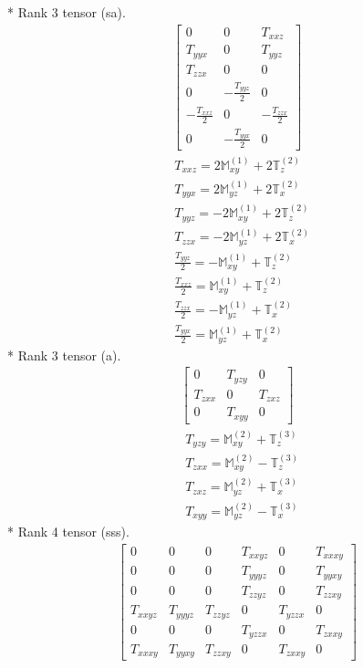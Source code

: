 \documentclass[fleqn,8pt,landscape]{jsarticle}
\begin{document}
* Rank 3 tensor (sa).
\begin{align*}
\begin{bmatrix} 0 & 0 & T_{xxz} \\ T_{yyx} & 0 & T_{yyz} \\ T_{zzx} & 0 & 0 \\ 0 & - \frac{T_{yyz}}{2} & 0 \\ - \frac{T_{xxz}}{2} & 0 & - \frac{T_{zzx}}{2} \\ 0 & - \frac{T_{yyx}}{2} & 0 \end{bmatrix}
\end{align*}
\begin{align*}
& T_{xxz} = 2 \mathbb{M}_{xy}^{(1)} + 2 \mathbb{T}_{z}^{(2)} \\
& T_{yyx} = 2 \mathbb{M}_{yz}^{(1)} + 2 \mathbb{T}_{x}^{(2)} \\
& T_{yyz} = - 2 \mathbb{M}_{xy}^{(1)} + 2 \mathbb{T}_{z}^{(2)} \\
& T_{zzx} = - 2 \mathbb{M}_{yz}^{(1)} + 2 \mathbb{T}_{x}^{(2)} \\
& \frac{T_{yyz}}{2} = - \mathbb{M}_{xy}^{(1)} + \mathbb{T}_{z}^{(2)} \\
& \frac{T_{xxz}}{2} = \mathbb{M}_{xy}^{(1)} + \mathbb{T}_{z}^{(2)} \\
& \frac{T_{zzx}}{2} = - \mathbb{M}_{yz}^{(1)} + \mathbb{T}_{x}^{(2)} \\
& \frac{T_{yyx}}{2} = \mathbb{M}_{yz}^{(1)} + \mathbb{T}_{x}^{(2)}
\end{align*}
* Rank 3 tensor (a).
\begin{align*}
\begin{bmatrix} 0 & T_{yzy} & 0 \\ T_{zxx} & 0 & T_{zxz} \\ 0 & T_{xyy} & 0 \end{bmatrix}
\end{align*}
\begin{align*}
& T_{yzy} = \mathbb{M}_{xy}^{(2)} + \mathbb{T}_{z}^{(3)} \\
& T_{zxx} = \mathbb{M}_{xy}^{(2)} - \mathbb{T}_{z}^{(3)} \\
& T_{zxz} = \mathbb{M}_{yz}^{(2)} + \mathbb{T}_{x}^{(3)} \\
& T_{xyy} = \mathbb{M}_{yz}^{(2)} - \mathbb{T}_{x}^{(3)}
\end{align*}
* Rank 4 tensor (sss).
\begin{align*}
\begin{bmatrix} 0 & 0 & 0 & T_{xxyz} & 0 & T_{xxxy} \\ 0 & 0 & 0 & T_{yyyz} & 0 & T_{yyxy} \\ 0 & 0 & 0 & T_{zzyz} & 0 & T_{zzxy} \\ T_{xxyz} & T_{yyyz} & T_{zzyz} & 0 & T_{yzzx} & 0 \\ 0 & 0 & 0 & T_{yzzx} & 0 & T_{zxxy} \\ T_{xxxy} & T_{yyxy} & T_{zzxy} & 0 & T_{zxxy} & 0 \end{bmatrix}
\end{align*}
\end{document}
